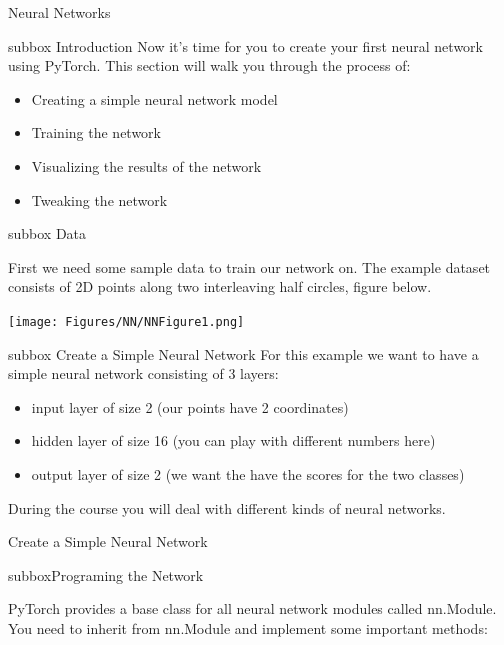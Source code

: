 \begin{multicols}{3}
\begin{textbox}{Neural Networks}
\begin{subbox}{subbox}{ Introduction}
\scriptsize
Now it’s time for you to create your first neural network using PyTorch. This section will walk you through the process of:
\begin{itemize}
    \item 
Creating a simple neural network model
    \item Training the network
    \item Visualizing the results of the network
    \item Tweaking the network
\end{itemize}
\end{subbox}
\begin{subbox}{subbox}{ Data }
\scriptsize

First we need some sample data to train our network on. The example dataset consists of 2D points along two interleaving half circles, figure below. 

\centering
\texttt{[image: Figures/NN/NNFigure1.png]}

\end{subbox}
\begin{subbox}{subbox}{ Create a Simple Neural Network}
\scriptsize
For this example we want to have a simple neural network consisting of 3 layers:

\begin{itemize}
\item
 input layer of size 2 (our points have 2 coordinates)
\item hidden layer of size 16 (you can play with different numbers here)

 \item
 output layer of size 2 (we want the have the scores for the two classes)
 \end{itemize}
 
During the course you will deal with different kinds of neural networks.
\end{subbox}
\end{textbox}
\begin{textbox}{Create a Simple Neural Network}
\begin{subbox}{subbox}{Programing the Network }
\scriptsize


PyTorch provides a base class for all neural network modules called nn.Module. You need to inherit from nn.Module and implement some important methods:


\end{subbox}
\end{textbox}
\end{multicols}
